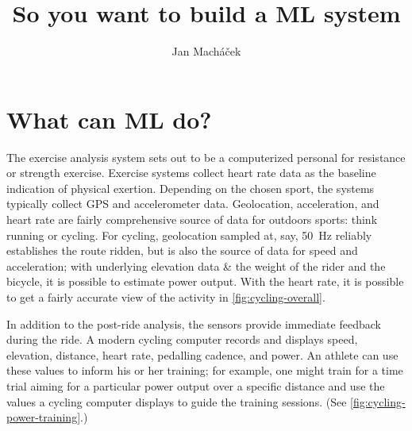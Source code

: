 



\title{So you want to build a ML system}

\author{Jan Macháček}




\section{What can ML do?}
The exercise analysis system sets out to be a computerized personal for resistance or strength exercise. Exercise systems collect heart rate data as the baseline indication of physical exertion. Depending on the chosen sport, the systems typically collect GPS and accelerometer data. Geolocation, acceleration, and heart rate are fairly comprehensive source of data for outdoors sports: think running or cycling. For cycling, geolocation sampled at, say, \SI{50}{\hertz} reliably establishes the route ridden, but is also the source of data for speed and acceleration; with underlying elevation data \& the weight of the rider and the bicycle, it is possible to estimate power output. With the heart rate, it is possible to get a  fairly accurate view of the activity in \autoref{fig:cycling-overall}.


In addition to the post-ride analysis, the sensors provide immediate feedback during the ride. A modern cycling computer records and displays speed, elevation, distance, heart rate, pedalling cadence, and power. An athlete can use these values to inform his or her training; for example, one might train for a time trial aiming for a particular power output over a specific distance and use the values a cycling computer displays to guide the training sessions. (See \autoref{fig:cycling-power-training}.)

